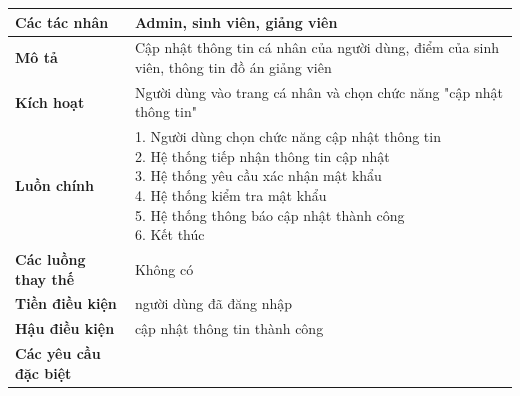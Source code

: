 \begin{tabular}{|l|l|}
	\hline
	\textbf{Các tác nhân}         & Admin, sinh viên, giảng viên                                                              \\
	\hline
	\textbf{Mô tả}                & Cập nhật thông tin cá nhân của người dùng, điểm của sinh viên, thông tin đồ án giảng viên \\
	\hline
	\textbf{Kích hoạt}            & Người dùng vào trang cá nhân và chọn chức năng "cập nhật thông tin"                       \\
	\hline
	\textbf{Luồn chính}           & \makecell[l]{1. Người dùng chọn chức năng cập nhật thông tin                              \\ 2. Hệ thống tiếp nhận thông tin cập nhật \\ 3. Hệ thống yêu cầu xác nhận mật khẩu \\ 4. Hệ thống kiểm tra mật khẩu \\ 5. Hệ thống thông báo cập nhật thành công \\ 6. Kết thúc} \\
	\hline
	\textbf{Các luồng thay thế}   & Không có                                                                                  \\
	\hline
	\textbf{Tiền điều kiện}       & người dùng đã đăng nhập                                                                   \\
	\hline
	\textbf{Hậu điều kiện}        & cập nhật thông tin thành công                                                             \\
	\hline
	\textbf{Các yêu cầu đặc biệt} &                                                                                           \\
	\hline
\end{tabular}

